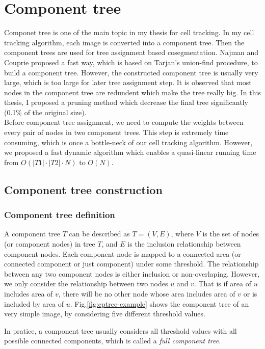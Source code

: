 \chapter{Component tree}\label{chapter:cptree} \label{chpt:cptree}
Componet tree is one of the main topic in my thesis for cell tracking. In my cell tracking algorithm, each image is converted into a component tree. Then the component trees are used for tree assignment based cosegmentation. Najman and Couprie \cite{Najman:04,najman2006building} proposed a fast way, which is based on Tarjan's union-find procedure, to build a component tree. However, the constructed component tree is usually very large, which is too large for later tree assignment step. It is observed that most nodes in the component tree are redundent which make the tree really big. In this thesis, I proposed a pruning method which decrease the final tree significantly (0.1\% of the original size).\\
Before component tree assignment, we need to compute the weights between every pair of nodes in two component trees. This step is extremely time consuming, which is once a bottle-neck of our cell tracking algorithm. However, we proposed a fast dynamic algorithm which enables a quasi-linear running time from $O(|T1|\cdot|T2|\cdot N)$ to $O(N)$.
\section{Component tree construction} \label{sec:cptree-def}
\subsection{Component tree definition}
A component tree $T$ can be described as $T=(V, E)$, where $V$ is the set of nodes (or component nodes) in tree $T$, and $E$ is the inclusion relationship between component nodes. Each component node is mapped to a connected area (or connected component or just component) under some threshold. The relationship between any two component nodes is either inclusion or non-overlaping. However, we only consider the relationship between two nodes $u$ and $v$. That is if area of $u$ includes area of $v$, there will be no other node whose area includes area of $v$ or is included by area of $u$. Fig.\ref{fig:cptree-example} shows the component tree of an very simple image, by considering five different threshold values.

In pratice, a component tree usually considers all threshold values with all possible connected components, which is called a \emph{full component tree}.


